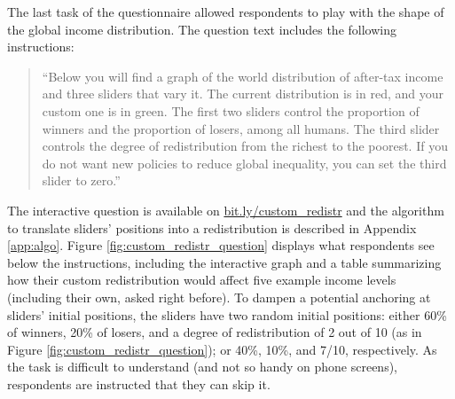 \documentclass[12pt,english]{article}
\begin{document}
\begin{bibunit}
The last task of the questionnaire allowed respondents to play with the shape of the global income distribution. The question text includes the following instructions: 
\begin{quote}``Below you will find a graph of the world distribution of after-tax income and three sliders that vary it. The current distribution is in red, and your custom one is in green. The first two sliders control the proportion of winners and the proportion of losers, among all humans. The third slider controls the degree of redistribution from the richest to the poorest. %
If you do not want new policies to reduce global inequality, you can set the third slider to zero.''\end{quote} 
The interactive question is available on \href{https://bit.ly/custom_redistr}{bit.ly/custom\_redistr} and the algorithm to translate sliders' positions into a redistribution is described in Appendix \ref{app:algo}. %
Figure \ref{fig:custom_redistr_question} displays what respondents see below the instructions, including the interactive graph and a table summarizing how their custom redistribution would affect five example income levels (including their own, asked right before). To dampen a potential anchoring at sliders' initial positions, the sliders have two random initial positions: %
either %
60\% of winners, 20\% of losers, and a degree of redistribution of 2 out of 10 (as in Figure \ref{fig:custom_redistr_question}); or %
40\%, 10\%, and 7/10, respectively. 
As the task is difficult to understand (and not so handy %
on phone screens), respondents are instructed that they can skip it. 


\end{bibunit}
\end{document}
